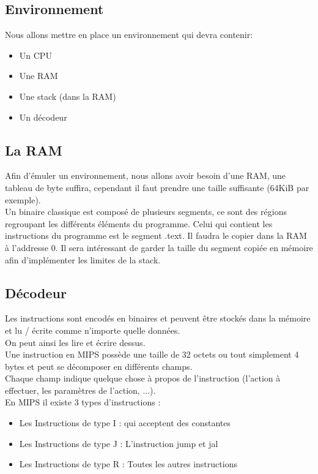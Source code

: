\subsection{Environnement}

Nous allons mettre en place un environnement qui devra contenir:
\begin{itemize}
\item Un CPU 
\item Une RAM
\item Une stack (dans la RAM)
\item Un décodeur
\end{itemize}

\subsection{La RAM}
Afin d'émuler un environnement, nous allons avoir besoin d'une RAM, une tableau de byte suffira, cependant il faut prendre une taille suffisante (64KiB par exemple).\\
Un binaire classique est composé de plusieurs segments, ce sont des régions regroupant les différents éléments du programme. Celui qui contient les instructions du programme est le segment .text. Il faudra le copier dans la RAM à l'addresse 0. Il sera intéressant de garder la taille du segment copiée en mémoire afin d'implémenter les limites de la stack.

\subsection{Décodeur}
Les instructions sont encodés en binaires et peuvent être stockés dans la mémoire et lu / écrite comme n'importe quelle données.\\
On peut ainsi les lire et écrire dessus.\\

Une instruction en MIPS possède une taille de 32 octets ou tout simplement 4 bytes et peut se décomposer en différents champs.\\
Chaque champ indique quelque chose à propos de l'instruction (l'action à effectuer, les paramètres de l'action, ...).\\

En MIPS il existe 3 types d'instructions :
\begin{itemize}
\item Les Instructions de type I : qui acceptent des constantes
\item Les Instructions de type J : L'instruction jump et jal
\item Les Instructions de type R : Toutes les autres instructions
\end{itemize}

